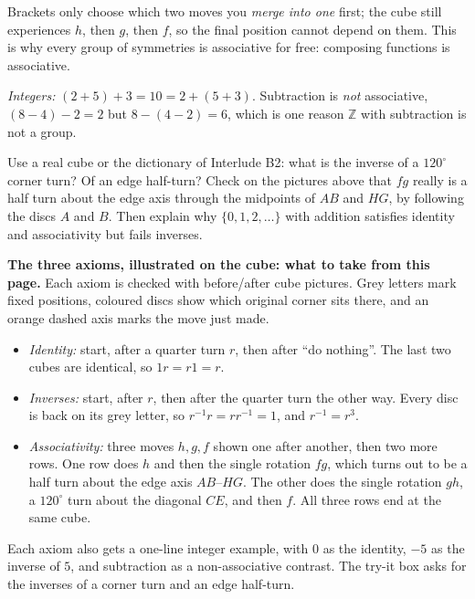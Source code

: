 \documentclass[10pt]{article}
\newcommand{\Z}{\mathbb{Z}}
\begin{document}
{\begin{minipage}[t]{744pt}
\begin{minipage}[t]{366pt}
\raggedright
Brackets only choose which two moves you \emph{merge into one} first; the cube still experiences $h$, then $g$, then $f$, so the final position cannot depend on them. This is why every group of symmetries is associative for free: composing functions is associative.\par\vspace{2pt}
\emph{Integers:} $(2+5)+3=10=2+(5+3)$. Subtraction is \emph{not} associative, $(8-4)-2=2$ but $8-(4-2)=6$, which is one reason $\Z$ with subtraction is not a group.
\end{minipage}
\par\vspace{6pt}
\begin{tryit}
Use a real cube or the dictionary of Interlude B2: what is the inverse of a $120^\circ$ corner turn? Of an edge half-turn? Check on the pictures above that $fg$ really is a half turn about the edge axis through the midpoints of $AB$ and $HG$, by following the discs $A$ and $B$. Then explain why $\{0,1,2,\dots\}$ with addition satisfies identity and associativity but fails inverses.
\end{tryit}
\vspace{2pt}
\begin{bigpic}
\textbf{The three axioms, illustrated on the cube: what to take from this page.} Each axiom is checked with before/after cube pictures. Grey letters mark fixed positions, coloured discs show which original corner sits there, and an orange dashed axis marks the move just made.
\begin{itemize}[nosep,leftmargin=1.2em]
\item \emph{Identity:} start, after a quarter turn $r$, then after ``do nothing''. The last two cubes are identical, so $1r=r1=r$.
\item \emph{Inverses:} start, after $r$, then after the quarter turn the other way. Every disc is back on its grey letter, so $r^{-1}r=rr^{-1}=1$, and $r^{-1}=r^{3}$.
\item \emph{Associativity:} three moves $h,g,f$ shown one after another, then two more rows. One row does $h$ and then the single rotation $fg$, which turns out to be a half turn about the edge axis $AB$--$HG$. The other does the single rotation $gh$, a $120^\circ$ turn about the diagonal $CE$, and then $f$. All three rows end at the same cube.
\end{itemize}
Each axiom also gets a one-line integer example, with $0$ as the identity, $-5$ as the inverse of $5$, and subtraction as a non-associative contrast. The try-it box asks for the inverses of a corner turn and an edge half-turn.
\end{bigpic}
\end{minipage}
}
\end{document}
